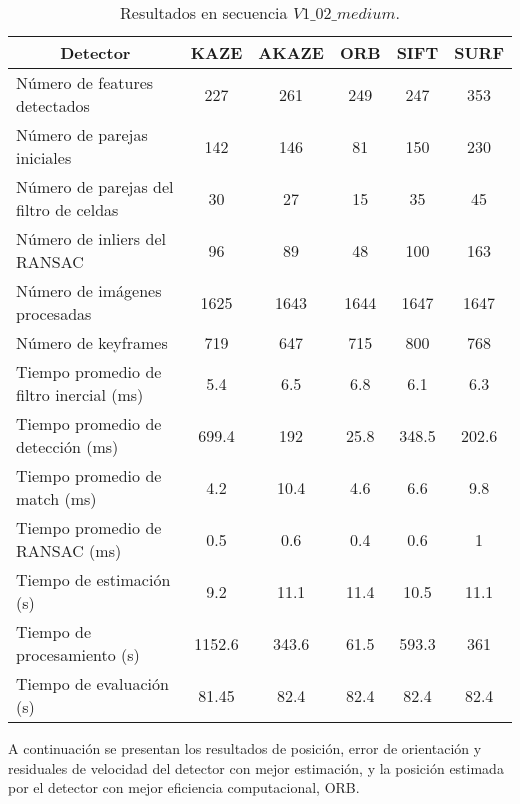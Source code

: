 \begin{table}[H]
	\caption{Resultados  en secuencia $V1\_02\_medium$.}
	\begin{tabular}{|l|c|c|c|c|c|}
		\hline
		\multicolumn{1}{|c|}{\textbf{Detector}} & \textbf{KAZE} & \textbf{AKAZE} & \textbf{ORB} & \textbf{SIFT} & \textbf{SURF} \\ \hline
		Número de features detectados & 227 & 261 & 249 & 247 & 353 \\ \hline
		Número de parejas iniciales & 142 & 146 & 81 & 150 & 230 \\ \hline
		Número de parejas del filtro de celdas & 30 & 27 & 15 & 35 & 45 \\ \hline
		Número de inliers del RANSAC & 96 & 89 & 48 & 100 & 163 \\ \hline
		Número de imágenes procesadas & 1625 & 1643 & 1644 & 1647 & 1647 \\ \hline
		Número de keyframes & 719 & 647 & 715 & 800 & 768 \\ \hline
		Tiempo promedio de filtro inercial (ms) & 5.4 & 6.5 & 6.8 & 6.1 & 6.3 \\ \hline
		Tiempo promedio de detección  (ms) & 699.4 & 192 & 25.8 & 348.5 & 202.6 \\ \hline
		Tiempo promedio de match (ms) & 4.2 & 10.4 & 4.6 & 6.6 & 9.8 \\ \hline
		Tiempo promedio de RANSAC (ms) & 0.5 & 0.6 & 0.4 & 0.6 & 1 \\ \hline
		Tiempo de estimación (s) & 9.2 & 11.1 & 11.4 & 10.5 & 11.1 \\ \hline
		Tiempo de  procesamiento (s) & 1152.6 & 343.6 & 61.5 & 593.3 & 361 \\ \hline
		Tiempo de evaluación (s) & 81.45 & 82.4 & 82.4 & 82.4 & 82.4 \\ \hline
	\end{tabular}
	\label{Tabla/Resultados/V1_02_medium}
\end{table}
%
%
%
%
%
%
%
%
%
A continuación se presentan los resultados de posición, error de orientación y residuales de velocidad del detector con mejor estimación, y la posición estimada por el detector con mejor eficiencia computacional, ORB.

